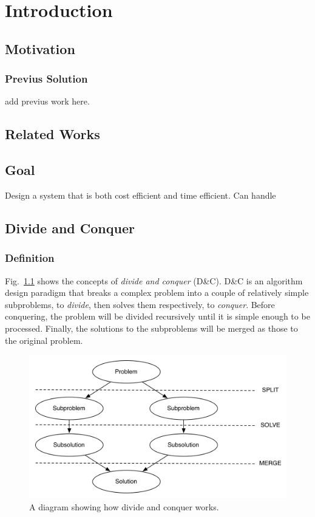 \chapter{Introduction}
\label{c:intro}

\section{Motivation}
\label{section:motivation}

\subsection{Previus Solution}
add previus work here.



\section{Related Works}
\label{section:related-work}

\section{Goal}
\label{section:goal}
Design a system that is both cost efficient and time efficient. Can handle 

\section{Divide and Conquer}
\subsection{Definition}
\label{section:divide-and-conquer}

Fig.~\ref{fig:DnC} shows the concepts of \emph{divide and conquer} (D\&C). D\&C is an algorithm design paradigm that breaks a complex problem into a couple of relatively simple subproblems, to \emph{divide}, then solves them respectively, to \emph{conquer}. Before conquering, the problem will be divided recursively until it is simple enough to be processed. Finally, the solutions to the subproblems will be merged as those to the original problem.

\begin{figure}[!htb]
    \centering
    \includegraphics[width=\textwidth]{figsrc/DnC.png}
    \caption{A diagram showing how divide and conquer works.\label{fig:DnC}}
\end{figure}

